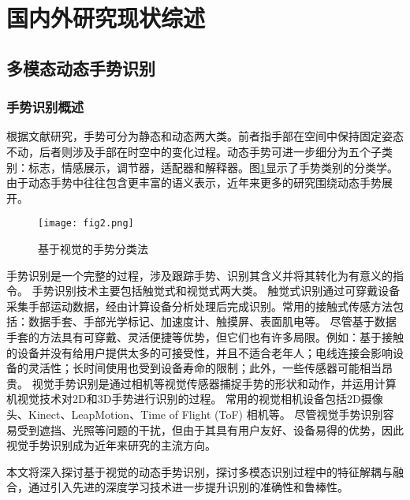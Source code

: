 \section{国内外研究现状综述}
\subsection{多模态动态手势识别}
\subsubsection{手势识别概述}
根据文献研究\cite{kaaniche2009gesture, rautaray2015vision}，手势可分为静态和动态两大类。前者指手部在空间中保持固定姿态不动，后者则涉及手部在时空中的变化过程。动态手势可进一步细分为五个子类别\cite{ottenheimer2018anthropology}：标志，情感展示，调节器，适配器和解释器。图\ref{fig:gesture_taxonomies}显示了手势类别的分类学。由于动态手势中往往包含更丰富的语义表示，近年来更多的研究围绕动态手势展开。
\begin{figure}
  \centering
  \texttt{[image: fig2.png]}
  \caption{基于视觉的手势分类法\cite{rautaray2015vision}}
  \label{fig:gesture_taxonomies}
\end{figure}

手势识别是一个完整的过程，涉及跟踪手势、识别其含义并将其转化为有意义的指令\cite{rautaray2015vision}。
手势识别技术主要包括触觉式和视觉式两大类\cite{oudah2020hand,rautaray2015vision}。
触觉式识别通过可穿戴设备采集手部运动数据，经由计算设备分析处理后完成识别。常用的接触式传感方法包括：数据手套、手部光学标记、加速度计、触摸屏、表面肌电等\cite{oudah2020hand}。
尽管基于数据手套的方法具有可穿戴、灵活便捷等优势，但它们也有许多局限。例如：基于接触的设备并没有给用户提供太多的可接受性\cite{rautaray2015vision}，并且不适合老年人；电线连接会影响设备的灵活性；长时间使用也受到设备寿命的限制；此外，一些传感器可能相当昂贵\cite{oudah2020hand}。
视觉手势识别是通过相机等视觉传感器捕捉手势的形状和动作，并运用计算机视觉技术对2D和3D手势进行识别的过程。
常用的视觉相机设备包括2D摄像头、Kinect、LeapMotion、Time of Flight (ToF) 相机等\cite{基于视觉的动态手势识别研究综述}。
尽管视觉手势识别容易受到遮挡、光照等问题的干扰，但由于其具有用户友好、设备易得的优势，因此视觉手势识别成为近年来研究的主流方向。

本文将深入探讨基于视觉的动态手势识别，探讨多模态识别过程中的特征解耦与融合，通过引入先进的深度学习技术进一步提升识别的准确性和鲁棒性。

